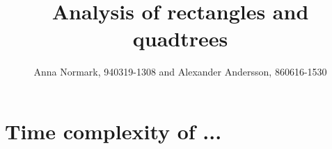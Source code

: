 \documentclass[12pt, a4paper]{article}
\title{Analysis of rectangles and quadtrees}
\author{Anna Normark, 940319-1308 and Alexander Andersson, 860616-1530}
\begin{document}
\maketitle

\section{Time complexity of ...}
\end{document}
